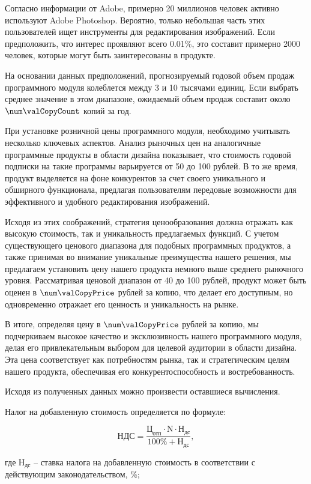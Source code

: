 Согласно информации от Adobe, примерно 20 миллионов человек активно используют Adobe Photoshop. Вероятно, только небольшая часть этих пользователей ищет инструменты для редактирования изображений. Если предположить, что интерес проявляют всего 0.01\%, это составит примерно 2000 человек, которые могут быть заинтересованы в продукте.

На основании данных предположений, прогнозируемый годовой объем продаж программного модуля колеблется между 3 и 10 тысячами единиц. Если выбрать среднее значение в этом диапазоне, ожидаемый объем продаж составит около $ \num\valCopyCount $ копий за год.

При установке розничной цены программного модуля, необходимо учитывать несколько ключевых аспектов. Анализ рыночных цен на аналогичные программные продукты в области дизайна показывает, что стоимость годовой подписки на такие программы варьируется от 50 до 100 рублей. В то же время, продукт выделяется на фоне конкурентов за счет своего уникального и обширного функционала, предлагая пользователям передовые возможности для эффективного и удобного редактирования изображений.

Исходя из этих соображений, стратегия ценообразования должна отражать как высокую стоимость, так и уникальность предлагаемых функций. С учетом существующего ценового диапазона для подобных программных продуктов, а также принимая во внимание уникальные преимущества нашего решения, мы предлагаем установить цену нашего продукта немного выше среднего рыночного уровня. Рассматривая ценовой диапазон от 40 до 100 рублей, продукт может быть оценен в $ \num\valCopyPrice $ рублей за копию, что делает его доступным, но одновременно отражает его ценность и уникальность на рынке.

В итоге, определяя цену в $ \num\valCopyPrice $ рублей за копию, мы подчеркиваем высокое качество и эксклюзивность нашего программного модуля, делая его привлекательным выбором для целевой аудитории в области дизайна. Эта цена соответствует как потребностям рынка, так и стратегическим целям нашего продукта, обеспечивая его конкурентоспособность и востребованность.

Исходя из полученных данных можно произвести оставшиеся вычисления.

Налог на добавленную стоимость определяется по формуле:

\begin{equation}
  \label{eq:econ:nds}
    \text{НДС} = \frac{\text{Ц}_\text{отп} \cdot \text{N} \cdot \text{Н}_\text{дс}}
    {100 \% + \text{Н}_\text{дс}},
\end{equation}
\begin{explanationx}
  \item[где] $ \text{Н}_\text{дс} $ -- ставка налога на добавленную стоимость в соответствии с 
действующим законодательством, \%;
\end{explanationx}

